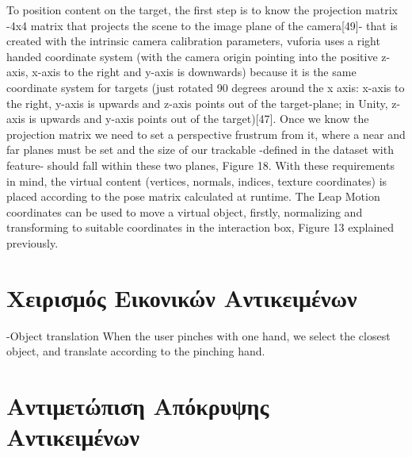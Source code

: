 To position content on the target, the first step is to know the projection matrix -4x4 matrix that projects the scene to the image plane of the camera[49]- that is created with the intrinsic camera calibration parameters, vuforia uses a right handed coordinate system (with the camera origin pointing into the positive z-axis, x-axis to the right and y-axis is downwards) because it is the same coordinate system for targets (just rotated 90 degrees around the x axis: x-axis to the right, y-axis is upwards and z-axis points out of the target-plane; in Unity, z-axis is upwards and y-axis points out of the target)[47]. Once we know the projection matrix we need to set a perspective frustrum from it, where a near and far planes must be set and the size of our trackable -defined in the dataset with feature- should fall within these two planes, Figure 18.
With these requirements in mind, the virtual content (vertices, normals, indices, texture coordinates)
is placed according to the pose matrix calculated at runtime.
The Leap Motion coordinates can be used to move a virtual object, firstly, normalizing and
transforming to suitable coordinates in the interaction box, Figure 13 explained previously.

\section{Χειρισμός Εικονικών Αντικειμένων} \label{s:manipulation}

-Object translation 
When the user pinches with one hand,
we select the closest object, and translate according to the
pinching hand.


\section{Αντιμετώπιση Απόκρυψης Αντικειμένων} \label{s:occlusion}

